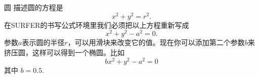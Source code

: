 ﻿\begin{surferPage}{圆}
描述圆的方程是
\[x^2+y^2=r^2.\]
在SURFER的书写公式环境里我们必须把以上方程重新写成
\[x^2+y^2-a^2=0.\]
参数$a$表示圆的半径$r$，可以用滑块来改变它的值。现在你可以添加第二个参数$b$来挤压圆，这样可以得到一个椭圆。比如
\[bx^2+y^2-a^2=0\] 其中 $b=0.5$.
\end{surferPage}
